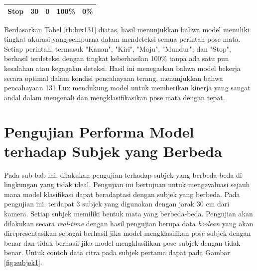 \begin{longtable}{|l|c|c|c|c|}
  Stop           & 30                                                                                           & 0                                                                                                 & 100\%                                                                                            & 0\%                                                                                                  \\ \hline
\end{longtable}

Berdasarkan Tabel \ref{tb:lux131} diatas, hasil menunjukkan bahwa model memiliki tingkat akurasi yang sempurna dalam mendeteksi semua perintah pose mata. Setiap perintah, termasuk "Kanan", "Kiri", "Maju", "Mundur", dan "Stop", berhasil terdeteksi dengan tingkat keberhasilan 100\% tanpa ada satu pun kesalahan atau kegagalan deteksi. Hasil ini menegaskan bahwa model bekerja secara optimal dalam kondisi pencahayaan terang, menunjukkan bahwa pencahayaan 131 Lux mendukung model untuk memberikan kinerja yang sangat andal dalam mengenali dan mengklasifikasikan pose mata dengan tepat.

\section{Pengujian Performa Model terhadap Subjek yang Berbeda}

Pada sub-bab ini, dilakukan pengujian terhadap subjek yang berbeda-beda di lingkungan yang tidak ideal. Pengujian ini bertujuan untuk mengevaluasi sejauh mana model klasifikasi dapat beradaptasi dengan subjek yang berbeda. Pada pengujian ini, terdapat 3 subjek yang digunakan dengan jarak 30 cm dari kamera. Setiap subjek memiliki bentuk mata yang berbeda-beda. Pengujian akan dilakukan secara \emph{real-time} dengan hasil pengujian berupa data \emph{boolean} yang akan direpresentasikan sebagai berhasil jika model mengklasifikan pose subjek dengan benar dan tidak berhasil jika model mengklasifikan pose subjek dengan tidak benar. Untuk contoh data citra pada subjek pertama dapat pada Gambar \ref{fig:subjek1}.


